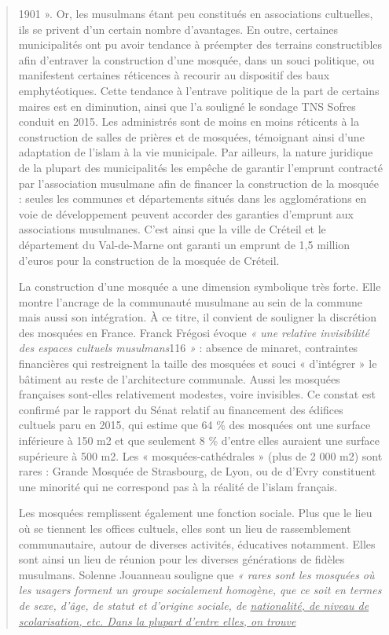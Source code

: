 \begin{quote}
1901 ». Or, les musulmans étant peu constitués en associations
cultuelles, ils se privent d'un certain nombre d'avantages. En outre,
certaines municipalités ont pu avoir tendance à préempter des terrains
constructibles afin d'entraver la construction d'une mosquée, dans un
souci politique, ou manifestent certaines réticences à recourir au
dispositif des baux emphytéotiques. Cette tendance à l'entrave politique
de la part de certains maires est en diminution, ainsi que l'a souligné
le sondage TNS Sofres conduit en 2015. Les administrés sont de moins en
moins réticents à la construction de salles de prières et de mosquées,
témoignant ainsi d'une adaptation de l'islam à la vie municipale. Par
ailleurs, la nature juridique de la plupart des municipalités les
empêche de garantir l'emprunt contracté par l'association musulmane afin
de financer la construction de la mosquée : seules les communes et
départements situés dans les agglomérations en voie de développement
peuvent accorder des garanties d'emprunt aux associations musulmanes.
C'est ainsi que la ville de Créteil et le département du Val-de-Marne
ont garanti un emprunt de 1,5 million d'euros pour la construction de la
mosquée de Créteil.

La construction d'une mosquée a une dimension symbolique très forte.
Elle montre l'ancrage de la communauté musulmane au sein de la commune
mais aussi son intégration. À ce titre, il convient de souligner la
discrétion des mosquées en France. Franck Frégosi évoque \emph{« une
relative invisibilité des espaces cultuels musulmans}116 \emph{»} :
absence de minaret, contraintes financières qui restreignent la taille
des mosquées et souci « d'intégrer » le bâtiment au reste de
l'architecture communale. Aussi les mosquées françaises sont-elles
relativement modestes, voire invisibles. Ce constat est confirmé par le
rapport du Sénat relatif au financement des édifices cultuels paru en
2015, qui estime que 64 \% des mosquées ont une surface inférieure à 150
m2 et que seulement 8 \% d'entre elles auraient une surface supérieure à
500 m2. Les « mosquées-cathédrales » (plus de 2 000 m2) sont rares :
Grande Mosquée de Strasbourg, de Lyon, ou de d'Evry constituent une
minorité qui ne correspond pas à la réalité de l'islam français.

Les mosquées remplissent également une fonction sociale. Plus que le
lieu où se tiennent les offices cultuels, elles sont un lieu de
rassemblement communautaire, autour de diverses activités, éducatives
notamment. Elles sont ainsi un lieu de réunion pour les diverses
générations de fidèles musulmans. Solenne Jouanneau souligne que \emph{«
rares sont les mosquées où les usagers forment un groupe socialement
homogène, que ce soit en termes de sexe, d'âge, de statut et d'origine
sociale, de \underline{nationalité, de niveau de scolarisation, etc.
Dans la plupart d'entre elles, on trouve}}


\end{quote}
